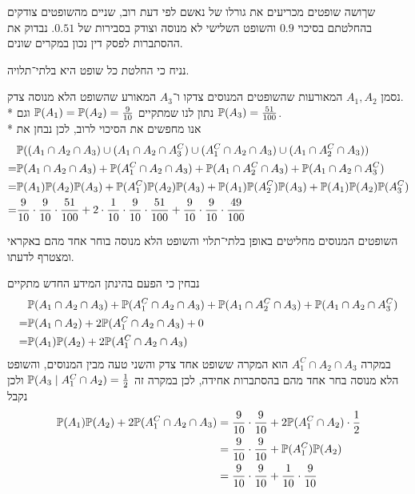 \Question{}
שךושה שופטים מכריעים את גורלו של נאשם לפי דעת רוב, שניים מהשופטים צודקים בהחלטתם בסיכוי $0.9$ והשופט השלישי לא מנוסה וצודק בסבירות של $0.51$.
נבדוק את ההסתברות לפסק דין נכון במקרים שונים.

\Subquestion{}
נניח כי החלטת כל שופט היא בלתי־תלויה.
\begin{solution}
	נסמן $A_1, A_2$ המאורעות שהשופטים המנוסים צדקו ו־$A_3$ המאורע שהשופט הלא מנוסה צדק. \\*
	נתון לנו שמתקיים $\mathbb{P}(A_1) = \mathbb{P}(A_2) = \frac{9}{10}$ וגם $\mathbb{P}(A_3) = \frac{51}{100}$. \\*
	אנו מחפשים את הסיכוי לרוב, לכן נבחן את
	\begin{align*}
		& \mathbb{P}((A_1 \cap A_2 \cap A_3) \cup (A_1 \cap A_2 \cap A_3^C) \cup (A_1^C \cap A_2 \cap A_3) \cup (A_1 \cap A_2^C \cap A_3)) \\
		= & \mathbb{P}(A_1 \cap A_2 \cap A_3) + \mathbb{P}(A_1^C \cap A_2 \cap A_3) + \mathbb{P}(A_1 \cap A_2^C \cap A_3) + \mathbb{P}(A_1 \cap A_2 \cap A_3^C) \\
		= & \mathbb{P}(A_1) \mathbb{P}(A_2) \mathbb{P}(A_3) + \mathbb{P}(A_1^C) \mathbb{P}(A_2) \mathbb{P}(A_3) + \mathbb{P}(A_1) \mathbb{P}(A_2^C) \mathbb{P}(A_3) + \mathbb{P}(A_1) \mathbb{P}(A_2) \mathbb{P}(A_3^C) \\
		= & \frac{9}{10} \cdot \frac{9}{10} \cdot \frac{51}{100} + 2 \cdot \frac{1}{10} \cdot \frac{9}{10} \cdot \frac{51}{100} + \frac{9}{10} \cdot \frac{9}{10} \cdot \frac{49}{100}
	\end{align*}
\end{solution}

\Subquestion{}
השופטים המנוסים מחליטים באופן בלתי־תלוי והשופט הלא מנוסה בוחר אחד מהם באקראי ומצטרף לדעתו.
\begin{solution}
	נבחין כי הפעם בהינתן המידע החדש מתקיים
	\begin{align*}
		& \mathbb{P}(A_1 \cap A_2 \cap A_3) + \mathbb{P}(A_1^C \cap A_2 \cap A_3) + \mathbb{P}(A_1 \cap A_2^C \cap A_3) + \mathbb{P}(A_1 \cap A_2 \cap A_3^C) \\
		= & \mathbb{P}(A_1 \cap A_2) + 2 \mathbb{P}(A_1^C \cap A_2 \cap A_3) + 0 \\
		= & \mathbb{P}(A_1) \mathbb{P}(A_2) + 2 \mathbb{P}(A_1^C \cap A_2 \cap A_3) \\
	\end{align*}
	במקרה $A_1^C \cap A_2 \cap A_3$ הוא המקרה ששופט אחד צדק והשני טעה מבין המנוסים, והשופט הלא מנוסה בחר אחד מהם בהסתברות אחידה, לכן במקרה זה $\mathbb{P}(A_3 \mid A_1^C \cap A_2) = \frac{1}{2}$ ולכן נקבל
	\begin{align*}
		\mathbb{P}(A_1) \mathbb{P}(A_2) + 2 \mathbb{P}(A_1^C \cap A_2 \cap A_3)
		& = \frac{9}{10} \cdot \frac{9}{10} + 2 \mathbb{P}(A_1^C \cap A_2) \cdot \frac{1}{2} \\
		& = \frac{9}{10} \cdot \frac{9}{10} + \mathbb{P}(A_1^C) \mathbb{P}(A_2) \\
		& = \frac{9}{10} \cdot \frac{9}{10} + \frac{1}{10} \cdot \frac{9}{10}
	\end{align*}
\end{solution}

